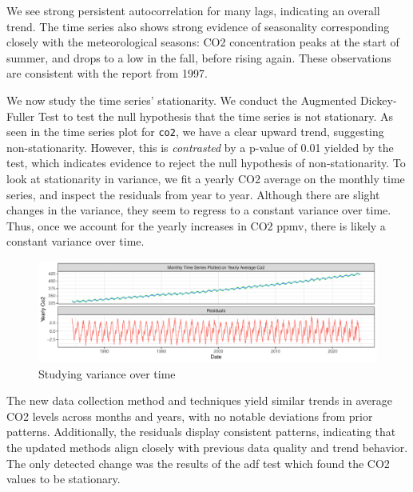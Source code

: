 \documentclass[
]{article}
\begin{document}
We see strong persistent autocorrelation for many lags, indicating an overall trend. The time series also shows strong evidence of seasonality corresponding closely with the meteorological seasons: CO2 concentration peaks at the start of summer, and drops to a low in the fall, before rising again. These observations are consistent with the report from 1997.

We now study the time series' stationarity. We conduct the Augmented Dickey-Fuller Test to test the null hypothesis that the time series is not stationary. As seen in the time series plot for \texttt{co2}, we have a clear upward trend, suggesting non-stationarity. However, this is \emph{contrasted} by a p-value of 0.01 yielded by the test, which indicates evidence to reject the null hypothesis of non-stationarity. To look at stationarity in variance, we fit a yearly CO2 average on the monthly time series, and inspect the residuals from year to year. Although there are slight changes in the variance, they seem to regress to a constant variance over time. Thus, once we account for the yearly increases in CO2 ppmv, there is likely a constant variance over time.

\begin{figure}

{\centering \includegraphics[width=1\linewidth]{lab_prompt_Updated_files/figure-latex/seasonality-irregularities-two-1} 

}

\caption{Studying variance over time}\label{fig:seasonality-irregularities-two}
\end{figure}

The new data collection method and techniques yield similar trends in average CO2 levels across months and years, with no notable deviations from prior patterns. Additionally, the residuals display consistent patterns, indicating that the updated methods align closely with previous data quality and trend behavior. The only detected change was the results of the adf test which found the CO2 values to be stationary.

\newpage
\end{document}
